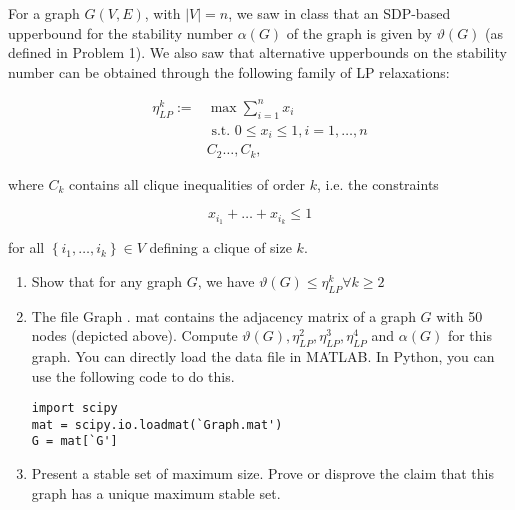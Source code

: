 \newpage

\pb


For a graph \(G(V, E)\), with \(|V|=n\), we saw in class that an SDP-based upperbound for the stability number \(\alpha(G)\) of the graph is given by \(\vartheta(G)\) (as defined in Problem 1). We also saw that alternative upperbounds on the stability number can be obtained through the following family of LP relaxations:

\[
\begin{aligned}
\eta_{L P}^{k}:= & \max \sum_{i=1}^{n} x_{i} \\
& \text { s.t. } 0 \leq x_{i} \leq 1, i=1, \ldots, n \\
& C_{2} \ldots, C_{k},
\end{aligned}
\]

where \(C_{k}\) contains all clique inequalities of order \(k\), i.e. the constraints

\[
x_{i_{1}}+\ldots+x_{i_{k}} \leq 1
\]

for all \(\left\{i_{1}, \ldots, i_{k}\right\} \in V\) defining a clique of size \(k\).

\begin{enumerate}[leftmargin=*]
\item Show that for any graph \(G\), we have \(\vartheta(G) \leq \eta_{L P}^{k} \forall k \geq 2\)
\item The file Graph . mat contains the adjacency matrix of a graph \(G\) with 50 nodes (depicted above). Compute \(\vartheta(G), \eta_{L P}^{2}, \eta_{L P}^{3}, \eta_{L P}^{4}\) and \(\alpha(G)\) for this graph. You can directly load the data file in MATLAB. In Python, you can use the following code to do this.
\begin{verbatim}
import scipy
mat = scipy.io.loadmat(`Graph.mat')
G = mat[`G']\end{verbatim}

\item Present a stable set of maximum size. Prove or disprove the claim that this graph has a unique maximum stable set.
\end{enumerate}

\soln

